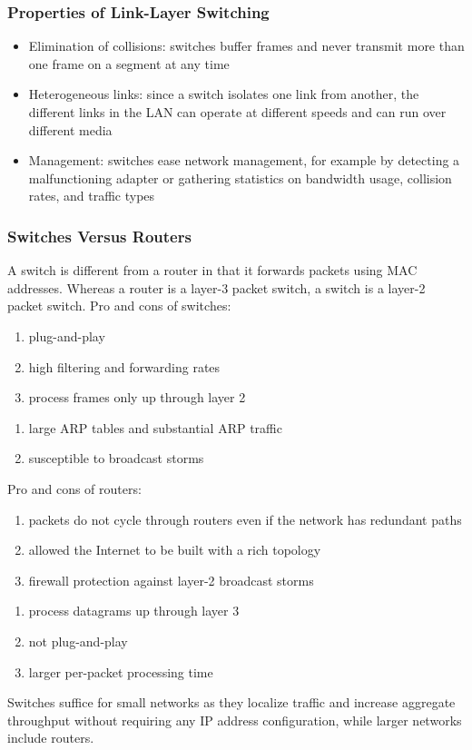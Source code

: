 \documentclass{article}
\begin{document}
\subsubsection*{Properties of Link-Layer Switching}
\begin{itemize}
    \item Elimination of collisions: switches buffer frames and never transmit more than one frame on a segment at any time
    \item Heterogeneous links: since a switch isolates one link from another, the different links in the LAN can operate at different speeds and can run over different media
    \item Management: switches ease network management, for example by detecting a malfunctioning adapter or gathering statistics on bandwidth usage, collision rates, and traffic types
\end{itemize}
\subsubsection*{Switches Versus Routers}
A switch is different from a router in that it forwards packets using MAC addresses. Whereas a router is a layer-3 packet switch, a switch is a layer-2 packet switch.
Pro and cons of switches:
\begin{enumerate}[label=+]
    \item plug-and-play
	\item high filtering and forwarding rates
	\item process frames only up through layer 2
\end{enumerate}	
\begin{enumerate}[label=-]
	\item large ARP tables and substantial ARP traffic
	\item susceptible to broadcast storms
\end{enumerate}	
Pro and cons of routers:
\begin{enumerate}[label=+]
	\item packets do not cycle through routers even if the network has redundant paths
	\item allowed the Internet to be built with a rich topology
	\item firewall protection against layer-2 broadcast storms
\end{enumerate}	
\begin{enumerate}[label=-]
	\item process datagrams up through layer 3
	\item not plug-and-play
	\item larger per-packet processing time
\end{enumerate}	
Switches suffice for small networks as they localize traffic and increase aggregate throughput without requiring any IP address configuration, while larger networks include routers.
\end{document}
